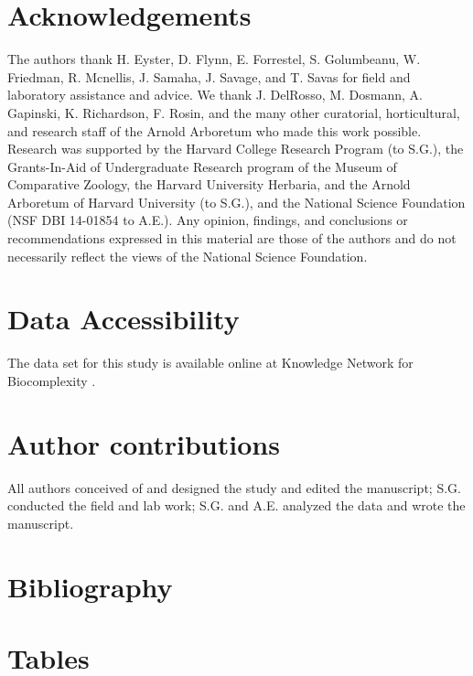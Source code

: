 \documentclass{article}
\begin{document}
\section*{Acknowledgements} %
The authors thank H. Eyster, D. Flynn, E. Forrestel, S. Golumbeanu, W. Friedman, R. Mcnellis, J. Samaha, J. Savage, and T. Savas for field and laboratory assistance and advice. We thank J. DelRosso, M. Dosmann, A. Gapinski, K. Richardson, F. Rosin, and the many other curatorial, horticultural, and research staff of the Arnold Arboretum who made this work possible. Research was supported by the Harvard College Research Program (to S.G.), the Grants-In-Aid of Undergraduate Research program of the Museum of Comparative Zoology, the Harvard University Herbaria, and the Arnold Arboretum of Harvard University (to S.G.), and the National Science Foundation (NSF DBI 14-01854 to A.E.). Any opinion, findings, and conclusions or recommendations expressed in this material are those of the authors and do not necessarily reflect the views of the National Science Foundation.

\section*{Data Accessibility}
The data set for this study is available online at Knowledge Network for Biocomplexity \citep{gee2017}. 

\section*{Author contributions} All authors conceived of and designed the study and edited the manuscript; S.G. conducted the field and lab work; S.G. and A.E. analyzed the data and wrote the manuscript.

\section{Bibliography}


\section* {Tables}
\end{document}
